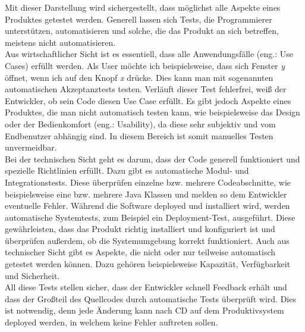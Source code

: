 Mit dieser Darstellung wird sichergestellt, dass möglichst alle Aspekte eines Produktes getestet werden. Generell lassen sich Tests, die Programmierer unterstützen, automatisieren und solche, die das Produkt an sich betreffen, meistens nicht automatisieren.  \\
Aus wirtschaftlicher Sicht ist es essentiell, dass alle Anwendungsfälle (eng.: Use Cases)  erfüllt werden. Als User möchte ich beispielsweise, dass sich Fenster \textit{y} öffnet, wenn ich auf den Knopf \textit{x} drücke. Dies kann man mit sogenannten automatischen Akzeptanztests testen. Verläuft dieser Test fehlerfrei, weiß der Entwickler, ob sein Code diesen Use Case erfüllt. Es gibt jedoch Aspekte eines Produktes, die man nicht automatisch testen kann, wie beispielsweise das Design oder der Bedienkomfort (eng.: Usability), da diese sehr subjektiv  und vom Endbenutzer abhängig sind. In diesem Bereich ist somit manuelles Testen unvermeidbar.\\
Bei der technischen Sicht geht es darum, dass der Code generell funktioniert und spezielle Richtlinien erfüllt. Dazu gibt es automatische Modul- und Integrationstests. Diese überprüfen einzelne bzw. mehrere Codeabschnitte, wie beispielsweise eine bzw. mehrere Java Klassen und melden so dem Entwickler eventuelle Fehler. Während die Software deployed und installiert wird, werden automatische Systemtests, zum Beispiel ein Deployment-Test, ausgeführt. Diese gewährleisten, dass das Produkt richtig installiert und konfiguriert ist und überprüfen außerdem, ob die Systemumgebung korrekt funktioniert. Auch aus technischer Sicht gibt es Aspekte, die nicht oder nur teilweise automatisch getestet werden können. Dazu gehören beispielsweise Kapazität, Verfügbarkeit und Sicherheit. \\
All diese Tests stellen sicher, dass der Entwickler schnell Feedback erhält und dass der Großteil des Quellcodes durch automatische Tests überprüft wird. Dies ist notwendig, denn jede Änderung kann nach \acs{CD} auf dem Produktivsystem deployed werden, in welchem keine Fehler auftreten sollen.


